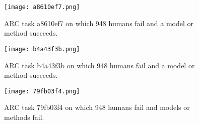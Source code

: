 \begin{figure}[H]
    \centering
    \texttt{[image: a8610ef7.png]}
    \label{fig:ARCeval}
    \caption{ARC task a8610ef7 on which 948 humans fail and a model or method succeeds.}
\end{figure}

\begin{figure}[H]
    \centering
    \texttt{[image: b4a43f3b.png]}
    \label{fig:ARCeval}
    \caption{ARC task b4a43f3b on which 948 humans fail and a model or method succeeds.}
\end{figure}

\begin{figure}[H]
    \centering
    \texttt{[image: 79fb03f4.png]}
    \label{fig:ARCeval}
    \caption{ARC task 79fb03f4 on which 948 humans fail and models or methods fail.}
\end{figure}


